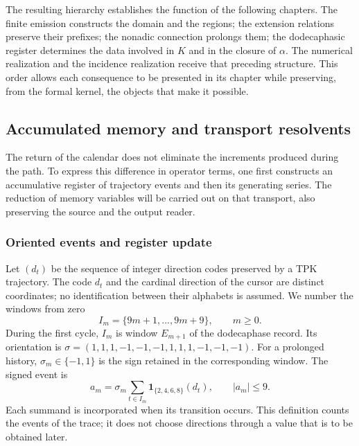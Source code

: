 The resulting hierarchy establishes the function of the following chapters.
The finite emission constructs the domain and the regions; the extension
relations preserve their prefixes; the nonadic connection prolongs them; the
dodecaphasic register determines the data involved in \(K\) and
in the closure of \(\alpha\). The numerical realization and the incidence
realization receive that preceding structure. This order allows
each consequence to be presented in its chapter while preserving, from the formal kernel,
the objects that make it possible.




\subsection{Accumulated memory and transport resolvents}
\label{x_reciprocidad:subsec:memoria-resolvente}

The return of the calendar does not eliminate the increments produced during
the path. To express this difference in operator terms, one first constructs
an accumulative register of trajectory events and then its
generating series. The reduction of memory variables will be carried out on
that transport, also preserving the source and the output reader.

\subsubsection{Oriented events and register update}

Let \((d_t)\) be the sequence of integer direction codes preserved
by a TPK trajectory. The code \(d_t\) and the cardinal direction
of the cursor are distinct coordinates; no identification
between their alphabets is assumed. We number the windows from zero
\[
 I_m=\{9m+1,\ldots,9m+9\},\qquad m\geq0.
\]
During the first cycle, \(I_m\) is window \(E_{m+1}\) of the
dodecaphase record. Its orientation is
\(\sigma=(1,1,1,-1,-1,-1,1,1,1,-1,-1,-1)\).
For a prolonged history, \(\sigma_m\in\{-1,1\}\) is the sign
retained in the corresponding window. The signed event is
\begin{equation}
 a_m=\sigma_m\sum_{t\in I_m}
       \mathbf1_{\{2,4,6,8\}}(d_t),\qquad |a_m|\leq9.
 \label{x_reciprocidad:mem:evento}
\end{equation}
Each summand is incorporated when its transition occurs. This definition
counts the events of the trace; it does not choose directions through a value
that is to be obtained later.

